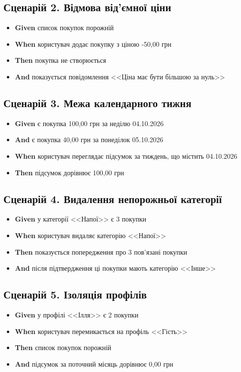 \documentclass[12pt,a4paper]{article}
\begin{document}
\subsection*{Сценарій 2. Відмова від'ємної ціни}
\begin{itemize}
  \item \textbf{Given} список покупок порожній
  \item \textbf{When} користувач додає покупку з ціною -50,00 грн
  \item \textbf{Then} покупка не створюється
  \item \textbf{And} показується повідомлення <<Ціна має бути більшою за нуль>>
\end{itemize}

\subsection*{Сценарій 3. Межа календарного тижня}
\begin{itemize}
  \item \textbf{Given} є покупка 100,00 грн за неділю 04.10.2026
  \item \textbf{And} є покупка 40,00 грн за понеділок 05.10.2026
  \item \textbf{When} користувач переглядає підсумок за тиждень, що містить 04.10.2026
  \item \textbf{Then} підсумок дорівнює 100,00 грн
\end{itemize}

\subsection*{Сценарій 4. Видалення непорожньої категорії}
\begin{itemize}
  \item \textbf{Given} у категорії <<Напої>> є 3 покупки
  \item \textbf{When} користувач видаляє категорію <<Напої>>
  \item \textbf{Then} показується попередження про 3 пов'язані покупки
  \item \textbf{And} після підтвердження ці покупки мають категорію <<Інше>>
\end{itemize}

\subsection*{Сценарій 5. Ізоляція профілів}
\begin{itemize}
  \item \textbf{Given} у профілі <<Ілля>> є 2 покупки
  \item \textbf{When} користувач перемикається на профіль <<Гість>>
  \item \textbf{Then} список покупок порожній
  \item \textbf{And} підсумок за поточний місяць дорівнює 0,00 грн
\end{itemize}
\end{document}
